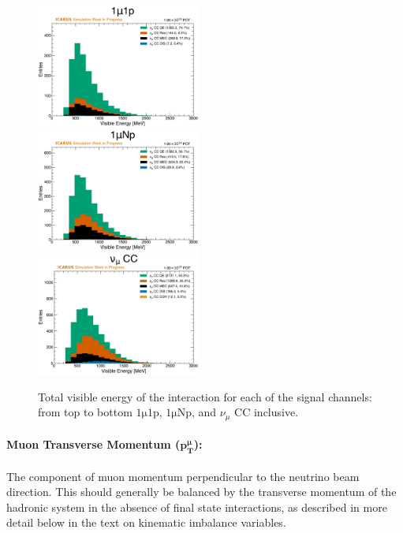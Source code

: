 \begin{figure}[!htb]
    \centering
    \includegraphics[width=0.48\textwidth]{figures/neutrino_selection/signal_hist1d_1mu1p_visible_energy.pdf}\\
    \includegraphics[width=0.48\textwidth]{figures/neutrino_selection/signal_hist1d_1muNp_visible_energy.pdf}\\
    \includegraphics[width=0.48\textwidth]{figures/neutrino_selection/signal_hist1d_1muX_visible_energy.pdf}\\
    \caption{Total visible energy of the interaction for each of the signal channels: from top to bottom $\mathrm{1\mu 1p}$, $\mathrm{1\mu Np}$, and $\nu_\mu$ CC inclusive.}
    \label{fig:visible_energy}
\end{figure}

\paragraph{Muon Transverse Momentum ($\mathbf{p_T^\mu}$):}
The component of muon momentum perpendicular to the neutrino beam direction. This should generally be balanced by the transverse momentum of the hadronic system in the absence of final state interactions, as described in more detail below in the text on kinematic imbalance variables.

